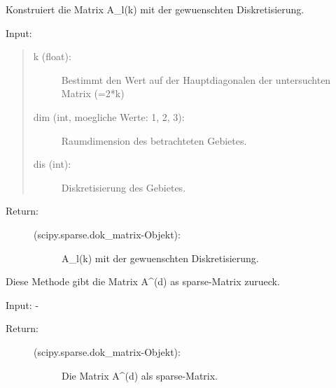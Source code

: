 \documentclass[a4paper,10pt,ngerman, openright]{sphinxmanual}
\begin{document}
\begin{fulllineitems}
\begin{fulllineitems}
\begin{description}
\end{description}

\end{fulllineitems}


\begin{fulllineitems}
\label{\detokenize{index:sparse.Sparse.constr_mat_l_k}}
Konstruiert die Matrix A\_l(k) mit der gewuenschten Diskretisierung.

Input:
\begin{quote}
\begin{description}
\item[{k (float):}] \leavevmode
Bestimmt den Wert auf der Hauptdiagonalen der untersuchten Matrix (=2*k)

\item[{dim (int, moegliche Werte: 1, 2, 3):}] \leavevmode
Raumdimension des betrachteten Gebietes.

\item[{dis (int):}] \leavevmode
Diskretisierung des Gebietes.

\end{description}
\end{quote}
\begin{description}
\item[{Return:}] \leavevmode\begin{description}
\item[{(scipy.sparse.dok\_matrix-Objekt):}] \leavevmode
A\_l(k) mit der gewuenschten Diskretisierung.

\end{description}

\end{description}

\end{fulllineitems}


\begin{fulllineitems}
\label{\detokenize{index:sparse.Sparse.return_mat_d}}
Diese Methode gibt die Matrix A\textasciicircum{}(d) as sparse-Matrix zurueck.

Input: -
\begin{description}
\item[{Return:}] \leavevmode\begin{description}
\item[{(scipy.sparse.dok\_matrix-Objekt):}] \leavevmode
Die Matrix A\textasciicircum{}(d) als sparse-Matrix.

\end{description}

\end{description}

\end{fulllineitems}


\end{fulllineitems}
\end{document}
